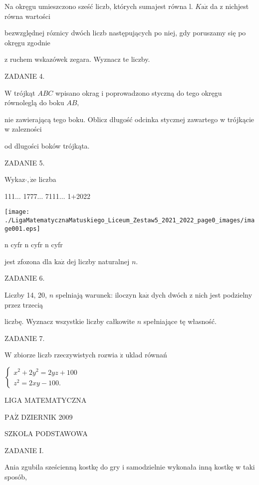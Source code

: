 \documentclass[a4paper,12pt]{article}
\begin{document}
Na okręgu umieszczono sześć liczb, których sumajest równa l. $K\mathrm{a}\dot{\mathrm{z}}$ da z nichjest równa wartości

bezwzględnej róznicy dwóch liczb następujących po niej, gdy poruszamy się po okręgu zgodnie

z ruchem wskazówek zegara. Wyznacz te liczby.

ZADANIE 4.

$\mathrm{W}$ trójkąt $ABC$ wpisano okrag i poprowadzono styczną do tego okręgu równoleglą do boku $AB,$

nie zawierającą tego boku. Oblicz długość odcinka stycznej zawartego w trójkącie w zalezności

od dlugości boków trójkąta.

ZADANIE 5.

Wykaz$\cdot, \dot{\mathrm{z}}\mathrm{e}$ liczba

111$\ldots$ 1777$\ldots$ 7111$\ldots$ 1$+$2022
\begin{center}
\texttt{[image: ./LigaMatematycznaMatuskiego\_Liceum\_Zestaw5\_2021\_2022\_page0\_images/image001.eps]}
\end{center}
n cyfr n cyfr  n cyfr

jest zfozona dla $\mathrm{k}\mathrm{a}\dot{\mathrm{z}}$ dej liczby naturalnej $n.$

ZADANIE 6.

Liczby 14, 20, $n$ spelniają warunek: iloczyn $\mathrm{k}\mathrm{a}\dot{\mathrm{z}}$ dych dwóch z nich jest podzielny przez trzecią

liczbę. Wyznacz wszystkie liczby całkowite $n$ spełniające tę własność.

ZADANIE 7.

$\mathrm{W}$ zbiorze liczb rzeczywistych rozwia $\dot{\mathrm{z}}$ uklad równań

$\left\{\begin{array}{l}
x^{2}+2y^{2}=2yz+100\\
z^{2}=2xy-100.
\end{array}\right.$






LIGA MATEMATYCZNA

$\mathrm{P}\mathrm{A}\acute{\mathrm{Z}}$ DZIERNIK 2009

SZKOLA PODSTAWOWA

ZADANIE I.

Ania zgubila sześcienną kostkę do gry i samodzielnie wykonała inną kostkę w taki sposób,
\end{document}

